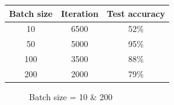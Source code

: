 \documentclass{article}
\begin{document}
\begin{center}
	\label{tab-2}
	\begin{tabular}{ccc}
		\toprule
		Batch size & Iteration & Test accuracy \\
		\midrule
		10 & 6500 & 52\% \\
		50 & 5000 & 95\% \\
		100 & 3500 & 88\% \\
		200 & 2000 & 79\% \\
		\bottomrule
	\end{tabular}
\end{center}

\begin{figure}
	\centering
	\caption{Batch size = 10 \& 200}
	\label{fig-2}
\end{figure}
\end{document}
